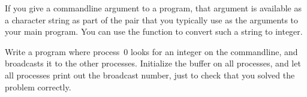   \label{ex:argv-bcast}
  If you give a commandline argument to a program, that argument is available
  as a character string as part of the  pair that you typically use
  as the arguments to your main program. You can use the function  to
  convert such a string to integer.

  Write a program where process~0 looks for an integer on the commandline, and
  broadcasts it to the other processes. Initialize the buffer on all processes, and
  let all processes print out the broadcast number,
  just to check that you solved the problem correctly.
